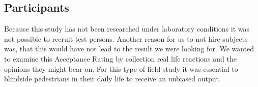 \documentclass[sigchi]{acmart}
\begin{document}
\subsection{Participants}

Because this study has not been researched under laboratory conditions it was not possible to recruit test persons. Another reason for us to not hire subjects was, that this would have not lead to the result we were looking for. We wanted to examine this Acceptance Rating by collection real life reactions and the opinions they might bear on. For this type of field study it was essential to blindside pedestrians in their daily life to receive an unbiased output. 




\appendix
\end{document}
